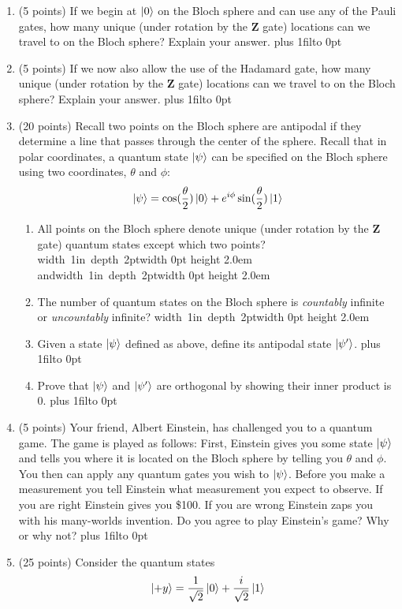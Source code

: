 \documentclass[12pt]{article}
\newcommand{\Blank}{\mbox{\hskip 4pt\vrule width 1in depth 2pt}\vrule width 0pt height 2.0em}
\def\DefaultSpace{1in}
\newcommand{\LeaveSpace}[1][\DefaultSpace]{%
\vskip #1 plus 1fil\relax\hbox to 0pt{\hss} %
}
\begin{document}
\begin{enumerate}[font=\bfseries]
\begin{enumerate}
    \end{enumerate}
    \item (5 points) If we begin at $\ket{0}$ on the Bloch sphere and can use any of the Pauli gates, how many unique (under rotation by the $\mathbf{Z}$ gate) locations can we travel to on the Bloch sphere? Explain your answer. \LeaveSpace{}
    \item (5 points) If we now also allow the use of the Hadamard gate, how many unique (under rotation by the $\mathbf{Z}$ gate) locations can we travel to on the Bloch sphere? Explain your answer. \LeaveSpace{}
    \item (20 points) Recall two points on the Bloch sphere are antipodal if they determine a line that passes through the center of the sphere. Recall that in polar coordinates, a quantum state $\ket{\psi}$ can be specified on the Bloch sphere using two coordinates, $\theta$ and $\phi$:
    \[\ket{\psi} = \cos(\frac{\theta}{2})\ket{0}
    + e^{i\phi}\sin(\frac{\theta}{2})\ket{1}\]
    \begin{enumerate}
        \item All points on the Bloch sphere denote unique (under rotation by the $\mathbf{Z}$ gate) quantum states except which two points? \Blank{} and\Blank{}
        \item The number of quantum states on the Bloch sphere is \emph{countably} infinite or \emph{uncountably} infinite? \Blank{}
        \item Given a state $\ket{\psi}$ defined as above, define its antipodal state $\ket{\psi'}$. \LeaveSpace{}
        \item Prove that $\ket{\psi}$ and $\ket{\psi'}$ are orthogonal by showing their inner product is 0. \LeaveSpace[2.0in]
    \end{enumerate}
    \item (5 points) Your friend, Albert Einstein, has challenged you to a quantum game. The game is played as follows: First, Einstein gives you some state $\ket{\psi}$ and tells you where it is located on the Bloch sphere by telling you $\theta$ and $\phi$. You then can apply any quantum gates you wish to $\ket{\psi}$. Before you make a measurement you tell Einstein what measurement you expect to observe. If you are right Einstein gives you \$100. If you are wrong Einstein zaps you with his many-worlds invention. Do you agree to play Einstein's game? Why or why not? \LeaveSpace{}
    \item (25 points) Consider the quantum states
        \[\ket{+y} = \frac{1}{\sqrt{2}}\ket{0} + \frac{i}{\sqrt{2}}\ket{1}\]

\end{enumerate}
\end{document}
